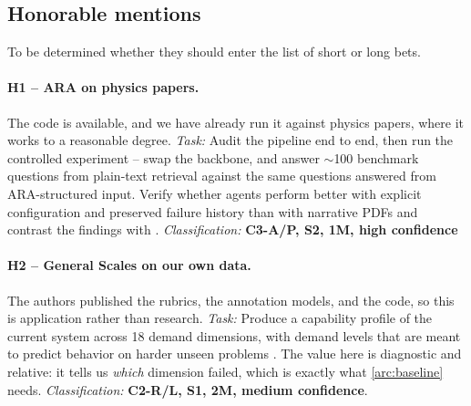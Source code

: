 \subsection{Honorable mentions}
\label{section:honorable_mentions}
 
To be determined whether they should enter the list of short or long bets.
 
\paragraph{H1 -- ARA on physics papers.} The code is available, and we have already run it against physics papers, where it works to a reasonable degree. \textit{Task:} Audit the pipeline end to end, then run the controlled experiment -- swap the backbone, and answer $\sim$100 benchmark questions from plain-text retrieval against the same questions answered from ARA-structured input. Verify whether agents perform better with explicit configuration and preserved failure history than with narrative PDFs and contrast the findings with \cite{2604.24658}.
\textit{Classification:} \textbf{C3-A/P, S2, 1M, high confidence}
 
\paragraph{H2 -- General Scales on our own data.} The authors published the rubrics, the annotation models, and the code, so this is application rather than research. \textit{Task:} Produce a capability profile of the current system across 18 demand dimensions, with demand levels that are meant to predict behavior on harder unseen problems \cite{Zhou2026}. The value here is diagnostic and relative: it tells us \emph{which} dimension failed, which is exactly what \ref{arc:baseline} needs.
 \textit{Classification:} \textbf{C2-R/L, S1, 2M, medium confidence}.
 
